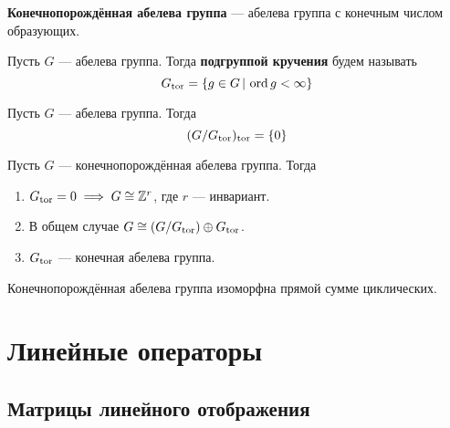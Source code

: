 \documentclass[../main.tex]{subfiles}
\begin{document}
\begin{definition}
  \textbf{Конечнопорождённая абелева группа} --- абелева группа с конечным числом образующих.
\end{definition}

\begin{definition}
  Пусть $G$ --- абелева группа. Тогда \textbf{подгруппой кручения} будем называть
  \begin{equation*}
    G_{\operatorname{tor}} = \{g \in G \, | \, \operatorname{ord} g < \infty\}
  \end{equation*}
\end{definition}
\begin{remark}
  Пусть $G$ --- абелева группа. Тогда
  \begin{equation*}
    (G/G_{\operatorname{tor}})_{\operatorname{tor}} = \{0\}
  \end{equation*}
\end{remark}

\begin{statement}
  Пусть $G$ --- конечнопорождённая абелева группа. Тогда
  \begin{enumerate}
    \item $G_{\operatorname{tor}} = 0 \implies G \cong \mathbb{Z}^r$, где $r$ --- инвариант.
    \item В общем случае $G \cong (G/G_{\operatorname{tor}}) \oplus G_{\operatorname{tor}}$.
    \item $G_{\operatorname{tor}}$ --- конечная абелева группа.
  \end{enumerate}
\end{statement}
\begin{corollary*}
  Конечнопорождённая абелева группа изоморфна прямой сумме циклических.
\end{corollary*}

\chapter{Линейные операторы}
\section{Матрицы линейного отображения}
\end{document}
